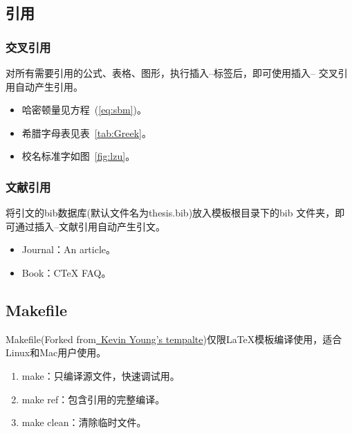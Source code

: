 \documentclass[twoside,longtitle]{LZUthesis}
\begin{document}
\subsection{引用}


\subsubsection{交叉引用}

对所有需要引用的公式、表格、图形，执行插入--标签后，即可使用插入-- 交叉引用自动产生引用。
\begin{itemize}
\item 哈密顿量见方程~(\ref{eq:sbm})。
\item 希腊字母表见表~\ref{tab:Greek}。
\item 校名标准字如图~\ref{fig:lzu}。
\end{itemize}

\subsubsection{文献引用}

将引文的bib数据库(默认文件名为thesis.bib)放入模板根目录下的bib 文件夹，即可通过插入--文献引用自动产生引文。
\begin{itemize}
\item Journal：An article\cite{Liu13PRA-A}。
\item Book：C\TeX{} FAQ\cite{Wu05-C}。
\end{itemize}

\subsection{Makefile}

Makefile(Forked from\href{https://bitbucket.org/kevinyounglzu/latextemplateoflzuthesis}{~Kevin Young's tempalte})仅限\LaTeX{}模板编译使用，适合Linux和Mac用户使用。
\begin{enumerate}
\item make：只编译源文件，快速调试用。
\item make ref：包含引用的完整编译。
\item make clean：清除临时文件。
\end{enumerate}
\end{document}
